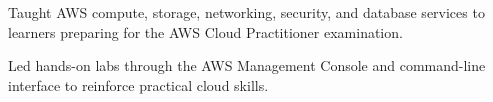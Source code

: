 \documentclass[letterpaper]{deedy-resume} %
\begin{document}
\begin{minipage}[t]{0.66\textwidth}
\sectionspace %







\vspace{\topsep} %
\begin{tightitemize}
\item Taught AWS compute, storage, networking, security, and database services to learners preparing for the AWS Cloud Practitioner examination.
\item Led hands-on labs through the AWS Management Console and command-line interface to reinforce practical cloud skills.
\end{tightitemize}

\sectionspace %





\end{minipage}
\end{document}
